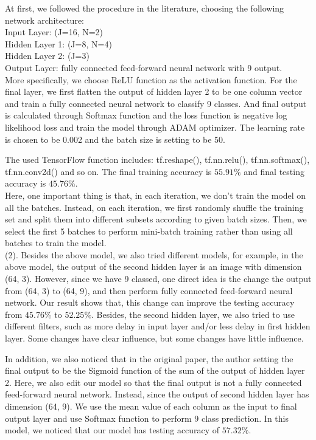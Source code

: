\noindent At first, we followed the procedure in the literature, choosing the following network architecture:\\
\indent Input Layer: (J=16, N=2)\\
\indent Hidden Layer 1: (J=8, N=4)\\
\indent Hidden Layer 2: (J=3)\\
\indent Output Layer: fully connected feed-forward neural network with 9 output.\\

\noindent More specifically, we choose ReLU function as the activation function. For the final layer, we first flatten the output of hidden layer 2 to be one column vector and train a fully connected neural network to classify 9 classes. And final output is calculated through Softmax function and the loss function is negative log likelihood loss and train the model through ADAM optimizer. The learning rate is chosen to be 0.002 and the batch size is setting to be 50.

The used TensorFlow function includes: tf.reshape(), tf.nn.relu(), tf.nn.softmax(), tf.nn.conv2d() and so on. The final training accuracy is $55.91\%$ and final testing accuracy is $45.76\%$. \\

 Here, one important thing is that, in each iteration, we don't train the model on all the batches. Instead, on each iteration, we first randomly shuffle the training set and split them into different subsets according to given batch sizes. Then, we select the first 5 batches to perform mini-batch training rather than using all batches to train the model.\\ 

(2). Besides the above model, we also tried different models, for example, in the above model, the output of the second hidden layer is an image with dimension (64, 3). However, since we have 9 classed, one direct idea is the change the output from (64, 3) to (64, 9), and then perform fully connected feed-forward neural network. Our result shows that, this change can improve the testing accuracy from $45.76\%$ to $52.25\%$. Besides, the second hidden layer, we also tried to use different filters, such as more delay in input layer and/or less delay in first hidden layer. Some changes have clear influence, but some changes have little influence.

In addition, we also noticed that in the original paper, the author setting the final output to be the Sigmoid function of the sum of the output of hidden layer 2. Here, we also edit our model so that the final output is not a fully connected feed-forward neural network. Instead, since the output of second hidden layer has dimension (64, 9). We use the mean value of each column as the input to final output layer and use Softmax function to perform 9 class prediction. In this model, we noticed that our model has testing accuracy of $57.32\%$.\\

